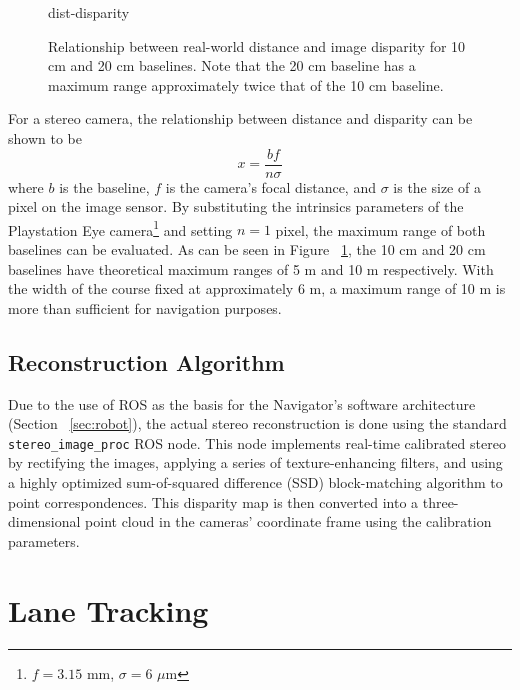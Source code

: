 \documentclass[11pt,twocolumn]{article}
\begin{document}
\begin{figure}
	{dist-disparity}
	\caption{
		Relationship between real-world distance and image disparity for
		10 cm and 20 cm baselines. Note that the 20 cm baseline has a maximum
		range approximately twice that of the 10 cm baseline.
	}
	\label{fig:stereo-dist-disparity}
\end{figure}

For a stereo camera, the relationship between distance and disparity can be
shown to be
\begin{equation*}
	x = \frac{bf}{n\sigma}
\end{equation*}
where $b$ is the baseline, $f$ is the camera's focal distance, and $\sigma$ is
the size of a pixel on the image sensor. By substituting the intrinsics
parameters of the Playstation Eye camera\footnote{$f = 3.15$ mm, $\sigma = 6$
$\mu$m} and setting $n = 1$ pixel, the maximum range of both baselines can be
evaluated. As can be seen in Figure ~\ref{fig:stereo-dist-disparity}, the 10 cm
and 20 cm baselines have theoretical maximum ranges of 5 m and 10 m
respectively. With the width of the course fixed at approximately 6 m, a
maximum range of 10 m is more than sufficient for navigation purposes.

\subsection{Reconstruction Algorithm}
\label{sec:stereo-correspond}
Due to the use of ROS as the basis for the Navigator's software architecture
(Section ~\ref{sec:robot}), the actual stereo reconstruction is done using the
standard \texttt{stereo\_image\_proc} ROS node. This node implements real-time
calibrated stereo by rectifying the images, applying a series of
texture-enhancing filters, and using a highly optimized sum-of-squared
difference (SSD) block-matching algorithm to point correspondences. This
disparity map is then converted into a three-dimensional point cloud in the
cameras' coordinate frame using the calibration parameters.


\section{Lane Tracking}
\label{sec:lane}
\end{document}
